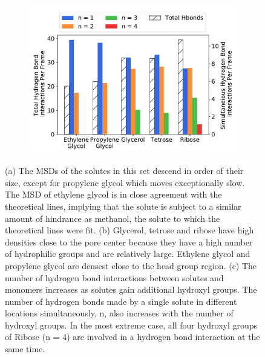 \documentclass[journal=jpcbfk,manuscript=article]{achemso}
\begin{document}
\begin{figure}[!htb]
\begin{subfigure}{0.325\textwidth}
  \includegraphics[width=\linewidth]{multi_hbonds.pdf}
  \caption{}\label{fig:multi_hbonds}
  \end{subfigure}
  \caption{(a) The MSDs of the solutes in this set descend in order of their size, except
  for propylene glycol which moves exceptionally slow. The MSD of ethylene glycol 
  is in close agreement with the theoretical lines, implying that the solute 
  is subject to a similar amount of hindrance as methanol, the solute to which the
  theoretical lines were fit. (b) Glycerol, tetrose and ribose have high densities 
  close to the pore center because they have a high number of hydrophilic groups and
  are relatively large. Ethylene glycol and propylene glycol are densest close to the
  head group region. (c) The number of hydrogen bond interactions between solutes and
  monomers increases as solutes gain additional hydroxyl groups. The number of 
  hydrogen bonds made by a single solute in different locations simultaneously, n, 
  also increases with the number of hydroxyl groups. In the most extreme case, all 
  four hydroxyl groups of Ribose (n = 4) are involved in a hydrogen bond interaction
  at the same time.}\label{fig:polyols}
  \end{figure}
  
\end{document}
